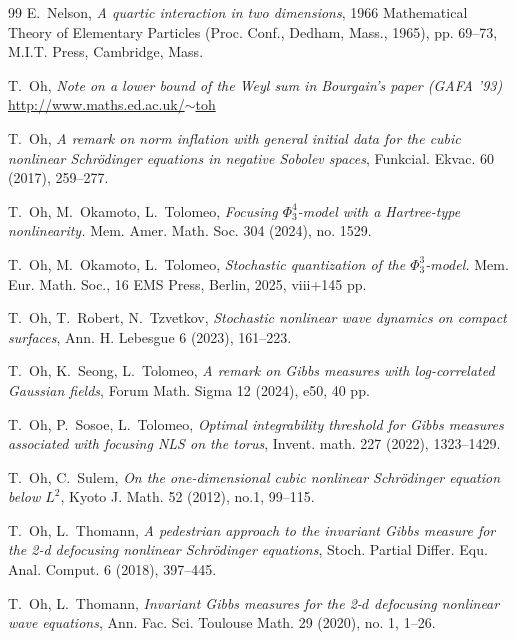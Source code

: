 \documentclass[%
11pt,  reqno]{amsart}
\newcommand{\1}{\hspace{0.2mm}\text{I}\hspace{0.2mm}}
\numberwithin{equation}{section}
\numberwithin{theorem}{section}
\begin{document}
\begin{thebibliography}{99}
E.~Nelson, 
{\it A quartic interaction in two dimensions}, 
1966 Mathematical Theory of Elementary Particles (Proc. Conf., Dedham, Mass., 1965), pp. 69--73, M.I.T. Press, Cambridge, Mass.



T.~Oh,
{\it Note on a lower bound of the Weyl sum in Bourgain's paper (GAFA '93)}
 \href{http://www.maths.ed.ac.uk/~toh}{http://www.maths.ed.ac.uk/$\sim$toh}


T.~Oh,
{\it A remark on norm inflation with general initial data for the cubic nonlinear Schr\"odinger equations in negative Sobolev spaces}, Funkcial. Ekvac. 60 (2017),  259--277. 


T.~Oh, M.~Okamoto, L.~Tolomeo,
{\it Focusing $\Phi^4_3$-model with a Hartree-type nonlinearity.}
Mem. Amer. Math. Soc. 304 (2024), no. 1529.


T.~Oh, M.~Okamoto, L.~Tolomeo,
{\it Stochastic quantization of the $\Phi^3_3$-model.} 
Mem. Eur. Math. Soc., 16
EMS Press, Berlin, 2025, viii+145 pp.




T.~Oh, T.~Robert, N.~Tzvetkov, 
{\it Stochastic nonlinear wave dynamics on compact surfaces},
 Ann. H. Lebesgue 6 (2023), 161--223. 



T.~Oh,  K.~Seong, L.~Tolomeo,
{\it  A remark on Gibbs measures with log-correlated Gaussian fields}, 
 Forum Math. Sigma 12 (2024), e50, 40 pp.


 T.~Oh, P.~Sosoe, L.~Tolomeo, 
 {\it Optimal integrability threshold for Gibbs measures associated with focusing NLS on the torus},
 Invent. math. 227 (2022), 1323--1429.


T.~Oh, C.~Sulem,
{\it  On the one-dimensional cubic nonlinear Schr\"odinger equation below $L^2$}, Kyoto J. Math. 52 (2012), no.1, 99--115. 


 T.~Oh,  L.~Thomann,
 {\it A pedestrian approach to the invariant Gibbs measure for the 2-d defocusing nonlinear Schr\"odinger equations}, 
 Stoch. Partial Differ. Equ. Anal. Comput. 6 (2018), 397--445. 


 T.~Oh,  L.~Thomann,
{\it Invariant Gibbs measures for the 2-$d$ defocusing nonlinear wave equations}, 
Ann. Fac. Sci. Toulouse Math. 29 (2020), no. 1, 1--26. 





\end{thebibliography}
\end{document}

